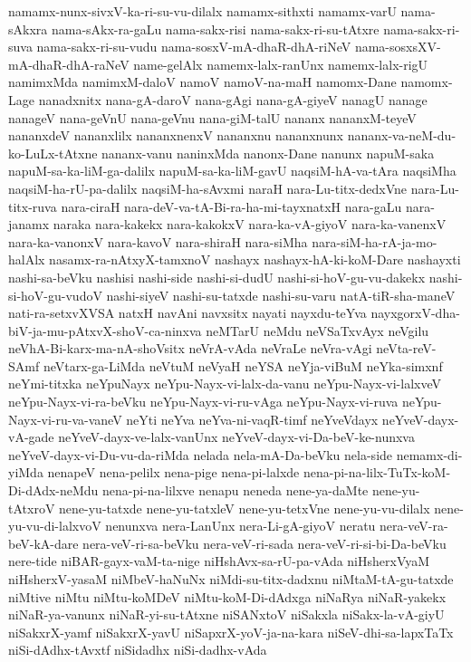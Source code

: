 {namamx-nunx-sivxV-ka-ri-su-vu-dilalx
namamx-sithxti
namamx-varU
nama-sAkxra
nama-sAkx-ra-gaLu
nama-sakx-risi
nama-sakx-ri-su-tAtxre
nama-sakx-ri-suva
nama-sakx-ri-su-vudu
nama-sosxV-mA-dhaR-dhA-riNeV
nama-sosxsXV-mA-dhaR-dhA-raNeV
name-gelAlx
namemx-lalx-ranUnx
namemx-lalx-rigU
namimxMda
namimxM-daloV
namoV
namoV-na-maH‌
namomx-Dane
namomx-Lage
nanadxnitx
nana-gA-daroV
nana-gAgi
nana-gA-giyeV
nanagU
nanage
nanageV
nana-geVnU
nana-geVnu
nana-giM-talU
nananx
nananxM-teyeV
nananxdeV
nananxlilx
nananxnenxV
nananxnu
nananxnunx
nananx-va-neM-du-ko-LuLx-tAtxne
nananx-vanu
naninxMda
nanonx-Dane
nanunx
napuM-saka
napuM-sa-ka-liM-ga-dalilx
napuM-sa-ka-liM-gavU
naqsiM-hA-va-tAra
naqsiMha
naqsiM-ha-rU-pa-dalilx
naqsiM-ha-sAvxmi
naraH
nara-Lu-titx-dedxVne
nara-Lu-titx-ruva
nara-ciraH
nara-deV-va-tA-Bi-ra-ha-mi-tayxnatxH
nara-gaLu
nara-janamx
naraka
nara-kakekx
nara-kakokxV
nara-ka-vA-giyoV
nara-ka-vanenxV
nara-ka-vanonxV
nara-kavoV
nara-shiraH
nara-siMha
nara-siM-ha-rA-ja-mo-halAlx
nasamx-ra-nAtxyX-tamxnoV
nashayx
nashayx-hA-ki-koM-Dare
nashayxti
nashi-sa-beVku
nashisi
nashi-side
nashi-si-dudU
nashi-si-hoV-gu-vu-dakekx
nashi-si-hoV-gu-vudoV
nashi-siyeV
nashi-su-tatxde
nashi-su-varu
natA-tiR-sha-maneV
nati-ra-setxvXVSA
natxH
navAni
navxsitx
nayati
nayxdu-teYva
nayxgorxV-dha-biV-ja-mu-pAtxvX-shoV-ca-ninxva
neMTarU
neMdu
neVSaTxvAyx
neVgilu
neVhA-Bi-karx-ma-nA-shoVsitx
neVrA-vAda
neVraLe
neVra-vAgi
neVta-reV-SAmf
neVtarx-ga-LiMda
neVtuM
neVyaH
neYSA
neYja-viBuM
neYka-simxnf
neYmi-titxka
neYpuNayx
neYpu-Nayx-vi-lalx-da-vanu
neYpu-Nayx-vi-lalxveV
neYpu-Nayx-vi-ra-beVku
neYpu-Nayx-vi-ru-vAga
neYpu-Nayx-vi-ruva
neYpu-Nayx-vi-ru-va-vaneV
neYti
neYva
neYva-ni-vaqR-timf
neYveVdayx
neYveV-dayx-vA-gade
neYveV-dayx-ve-lalx-vanUnx
neYveV-dayx-vi-Da-beV-ke-nunxva
neYveV-dayx-vi-Du-vu-da-riMda
nelada
nela-mA-Da-beVku
nela-side
nemamx-di-yiMda
nenapeV
nena-pelilx
nena-pige
nena-pi-lalxde
nena-pi-na-lilx-TuTx-koM-Di-dAdx-neMdu
nena-pi-na-lilxve
nenapu
neneda
nene-ya-daMte
nene-yu-tAtxroV
nene-yu-tatxde
nene-yu-tatxleV
nene-yu-tetxVne
nene-yu-vu-dilalx
nene-yu-vu-di-lalxvoV
nenunxva
nera-LanUnx
nera-Li-gA-giyoV
neratu
nera-veV-ra-beV-kA-dare
nera-veV-ri-sa-beVku
nera-veV-ri-sada
nera-veV-ri-si-bi-Da-beVku
nere-tide
niBAR-gayx-vaM-ta-nige
niHshAvx-sa-rU-pa-vAda
niHsherxVyaM
niHsherxV-yasaM
niMbeV-haNuNx
niMdi-su-titx-dadxnu
niMtaM-tA-gu-tatxde
niMtive
niMtu
niMtu-koMDeV
niMtu-koM-Di-dAdxga
niNaRya
niNaR-yakekx
niNaR-ya-vanunx
niNaR-yi-su-tAtxne
niSANxtoV
niSakxla
niSakx-la-vA-giyU
niSakxrX-yamf
niSakxrX-yavU
niSapxrX-yoV-ja-na-kara
niSeV-dhi-sa-lapxTaTx
niSi-dAdhx-tAvxtf
niSidadhx
niSi-dadhx-vAda
}
